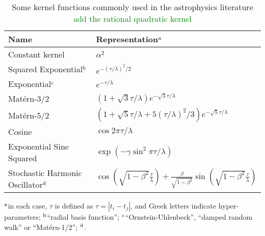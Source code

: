 \documentclass[letterpaper]{ar-1col}
\newcommand{\dan}[1]{\textcolor{green}{#1}}
\newcommand{\dt}{\ensuremath{\tau}}
\newcommand{\amplitude}{\ensuremath{\alpha}}
\newcommand{\lengthscale}{\ensuremath{\lambda}}
\begin{document}
\begin{table}[ht]
  \caption{Some kernel functions commonly used in the astrophysics literature \dan{add the rational quadratic kernel}}
  \label{tab:kernels}
  \begin{center}
    \begin{tabular}{@{}l|l@{}}
      \hline
      Name                           &  Representation$^{\rm a}$                                    \\
      \hline
      Constant kernel                & $\amplitude^2$                                                     \\
      Squared Exponential$^{\rm b}$  & $e^{-(\dt/\lengthscale)^2/2}$                                              \\
      Exponential$^{\rm c}$          & $e^{-\dt/\lengthscale}$                                                  \\
      Mat\'ern-3/2                   & $\left(1 + \sqrt{3}\dt/\lengthscale\right)e^{-\sqrt{3}\dt/\lengthscale}$             \\
      Mat\'ern-5/2                   & $\left(1 + \sqrt{5}\dt/\lengthscale +5(\dt/\lengthscale)^2/3\right)e^{-\sqrt{5}\dt/\lengthscale}$  \\
      Cosine                         & $\cos 2\pi\dt/\lengthscale$                                                  \\
      Exponential Sine Squared       & $\exp\left(-\gamma\sin^2\pi\dt/\lengthscale\right)$                      \\
      Stochastic Harmonic Oscillator$^{\rm d}$ & $\cos\left(\sqrt{1-\beta^2}\frac{\dt}{\lengthscale}\right) + \frac{\beta}{\sqrt{1-\beta^2}}\sin\left(\sqrt{1-\beta^2}\frac{\dt}{\lengthscale}\right)$                          \\
      \hline
    \end{tabular}
  \end{center}
  \begin{tabnote}
    $^{\rm a}$in each case, $\dt$ is defined as $\dt = \left|t_i - t_j\right|$, and Greek letters indicate hyper-parameters;
    $^{\rm b}$``radial basis function'';
    $^{\rm c}$``Ornstein-Uhlenbeck'', ``damped random walk'' or ``Mat\'ern-1/2'';
    $^{\rm d}$\citet{celerite}.
  \end{tabnote}
\end{table}
\end{document}
